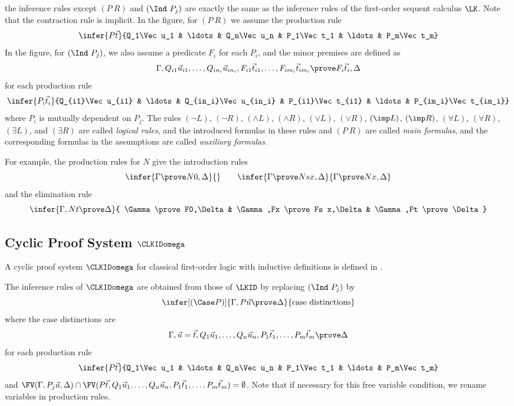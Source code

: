 the inference rules except $(P\ R)$ and $(\Ind\ P_j)$ are exactly the same as
the inference rules of the first-order sequent calculus $\LK$.
Note that the contraction rule is implicit.
In the figure,
for $(P\ R)$ we assume the production rule
\[
\infer{P\Vec t}{Q_1\Vec u_1 & \ldots & Q_n\Vec u_n & P_1\Vec t_1 & \ldots & P_m\Vec t_m}
\]
In the figure, 
for $(\Ind\ P_j)$, we also assume 
a predicate $F_i$ for each $P_i$,
and
the minor premises are defined as 
\[
\Gamma, Q_{i1}\Vec u_{i1}, \ldots, Q_{in_i}\Vec u_{in_i}, 
F_{i1}\Vec t_{i1}, \ldots, F_{im_i}\Vec t_{im_i}
\prove F_i\Vec t_i,\Delta
\]
for each production rule
\[
\infer{P_i\Vec t_i}{Q_{i1}\Vec u_{i1} & \ldots & Q_{in_i}\Vec u_{in_i} & P_{i1}\Vec t_{i1} & \ldots & P_{im_i}\Vec t_{im_i}}
\]
where $P_i$ is mutually dependent on $P_j$.
The rules $(\neg L)$, $(\neg R)$,
$(\land L)$, $(\land R)$,
$(\lor L)$, $(\lor R)$,
$(\imp L)$, $(\imp R)$,
$(\forall L)$, $(\forall R)$,
$(\exists L)$, and $(\exists R)$
are called {\em logical rules}, and
the introduced formulas in these rules and $(P\ R)$
are called {\em main formulas},
and the corresponding formulas in the assumptions are called {\em auxiliary
formulas}.

For example, the production rules for $N$ give the introduction rules
\[
\infer{\Gamma \prove N0,\Delta}{}
\qquad
\infer{\Gamma \prove Ns x,\Delta}{\Gamma \prove Nx,\Delta}
\]
and the elimination rule
\[
\infer{\Gamma,Nt \prove \Delta}{
\Gamma \prove F0,\Delta
&
\Gamma,Fx \prove Fs x,\Delta
&
\Gamma,Ft \prove \Delta
}
\]

\subsection{Cyclic Proof System $\CLKIDomega$}

A cyclic proof system $\CLKIDomega$ 
for classical first-order logic with inductive definitions
is defined in \cite{Brotherston11}.

The inference rules of $\CLKIDomega$ are obtained from
those of $\LKID$ by replacing $(\Ind\ P_j)$ by
\[
\infer[(\Case P)]{\Gamma, P\Vec u \prove \Delta}{
\hbox{case distinctions}
}
\]
where the case distinctions are
\[
\Gamma,\Vec u=\Vec t,
Q_1\Vec u_1, \ldots, Q_n\Vec u_n, P_1\Vec t_1, \ldots, P_m\Vec t_m
\prove \Delta
\]
for each production rule
\[
\infer{P\Vec t}{Q_1\Vec u_1 & \ldots & Q_n\Vec u_n & P_1\Vec t_1 & \ldots & P_m\Vec t_m}
\]
and
$\FV(\Gamma,P_j\Vec u, \Delta)
\cap \FV(P\Vec t,Q_1\Vec u_1, \ldots, Q_n\Vec u_n, P_1\Vec t_1, \ldots, P_m\Vec t_m) = \emptyset$.
Note that if necessary for this free variable condition, 
we rename variables in production rules.

